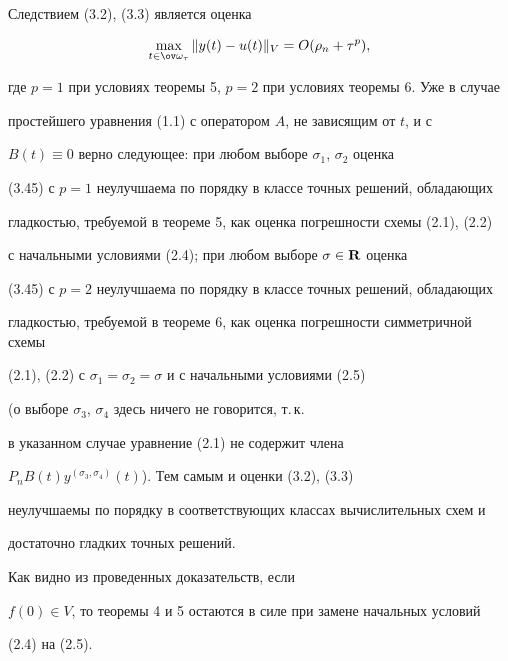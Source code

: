 \begin{note}


Следствием (3.2), (3.3) является оценка


\begin{equation}


\max\limits_{t\in\ov\omega_{\tau}}\|y(t)-u(t)\|_V


=O(\rho_n+\tau^p),


\end{equation}


где $p=1$ при условиях теоремы 5, $p=2$ при условиях теоремы 6. Уже в случае


простейшего уравнения (1.1) с оператором $A$, не зависящим от $t$, и с


$B(t)\equiv0$ верно следующее: при любом выборе $\sigma_1$, $\sigma_2$ оценка


(3.45) с $p=1$ неулучшаема по порядку в классе точных решений, обладающих


гладкостью, требуемой в теореме 5, как оценка погрешности схемы (2.1), (2.2)


с начальными условиями (2.4); при любом выборе $\sigma\in{\bold R}$ оценка


(3.45) с $p=2$ неулучшаема по порядку в классе точных решений, обладающих


гладкостью, требуемой в теореме 6, как оценка погрешности симметричной схемы


(2.1), (2.2) с $\sigma_1=\sigma_2=\sigma$ и с начальными условиями (2.5)


(о выборе $\sigma_3$, $\sigma_4$ здесь ничего не говорится, т.\,к.


в указанном случае уравнение (2.1) не содержит члена


$P_nB(t)y^{(\sigma_3,\sigma_4)}(t)$). Тем самым и оценки (3.2), (3.3)


неулучшаемы по порядку в соответствующих классах вычислительных схем и


достаточно гладких точных решений.


\end{note}





\begin{note}


Как видно из проведенных доказательств, если


$f(0)\in V$, то теоремы 4 и 5 остаются в силе при замене начальных условий


(2.4) на (2.5).


\end{note}





